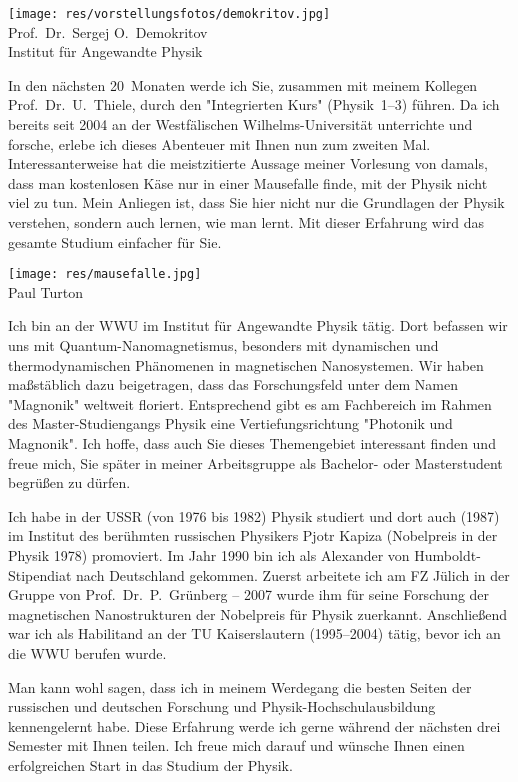 \begin{multicols}{2}
\begin{center}
\texttt{[image: res/vorstellungsfotos/demokritov.jpg]}\\
\smallskip
Prof.\ Dr.\ Sergej O.\ Demokritov\\
Institut für Angewandte Physik
\end{center}

In den nächsten 20~Monaten werde ich Sie, zusammen mit meinem Kollegen Prof.\ Dr.\ U.\ Thiele, durch den "Integrierten Kurs" (Physik~1--3) führen. Da ich bereits seit 2004 an der Westfälischen Wilhelms-Universität unterrichte und forsche, erlebe ich dieses Abenteuer mit Ihnen nun zum zweiten Mal. Interessanterweise hat die meistzitierte Aussage meiner Vorlesung von damals, dass man kostenlosen Käse nur in einer Mausefalle finde, mit der Physik nicht viel zu tun. Mein Anliegen ist, dass Sie hier nicht nur die Grundlagen der Physik verstehen, sondern auch lernen, wie man lernt. Mit dieser Erfahrung wird das gesamte Studium einfacher für Sie. 

\begin{center}
\texttt{[image: res/mausefalle.jpg]}\\
\hfill {\textcopyright} Paul Turton
\end{center}

Ich bin an der WWU im Institut für Angewandte Physik tätig. Dort befassen wir uns mit Quantum-Nanomagnetismus, besonders mit dynamischen und thermodynamischen Phänomenen in magnetischen Nanosystemen. Wir haben maßstäblich dazu beigetragen, dass das Forschungsfeld unter dem Namen "Magnonik" weltweit floriert. Entsprechend gibt es am Fachbereich im Rahmen des Master-Studiengangs Physik eine Vertiefungsrichtung "Photonik und Magnonik". Ich hoffe, dass auch Sie dieses Themengebiet interessant finden und freue mich, Sie später in meiner Arbeitsgruppe als Bachelor- oder Masterstudent begrüßen zu dürfen.

Ich habe in der USSR (von 1976 bis 1982) Physik studiert und dort auch (1987) im Institut des berühmten russischen Physikers Pjotr Kapiza (Nobelpreis in der Physik 1978) promoviert. Im Jahr 1990 bin ich als Alexander von Humboldt-Stipendiat nach Deutschland gekommen. Zuerst arbeitete ich am FZ Jülich in der Gruppe von Prof.\ Dr.\ P.\ Grünberg -- 2007 wurde ihm für seine Forschung der magnetischen Nanostrukturen der Nobelpreis für Physik zuerkannt. Anschließend war ich als Habilitand an der TU Kaiserslautern (1995--2004) tätig, bevor ich an die WWU berufen wurde.

Man kann wohl sagen, dass ich in meinem Werdegang die besten Seiten der russischen und deutschen Forschung und Physik-Hochschulausbildung kennengelernt habe. Diese Erfahrung werde ich gerne während der nächsten drei Semester mit Ihnen teilen. Ich freue mich darauf und wünsche Ihnen einen erfolgreichen Start in das Studium der Physik.
\end{multicols}

